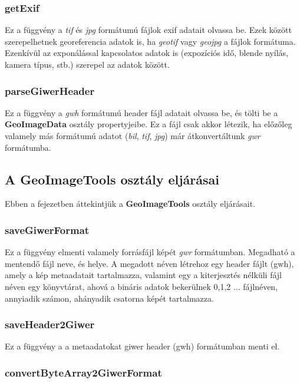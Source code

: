 \documentclass[a4paper,12pt]{article}
\begin{document}
\subsubsection{getExif}

Ez a függvény a \textit{tif} és \textit{jpg} formátumú fájlok exif adatait olvassa be. Ezek között szerepelhetnek georeferencia adatok is, ha \textit{geotif} vagy \textit{geojpg} a fájlok formátuma. Ezenkívül az exponálással kapcsolatos adatok is (expozíciós idő, blende nyílás, kamera típus, stb.) szerepel az adatok között.


\subsubsection{parseGiwerHeader}

Ez a függvény a \textit{gwh} formátumú header fájl adatait olvassa be, és tölti be a \textbf{GeoImageData} osztály propertyjeibe. Ez a fájl csak akkor létezik, ha előzőleg valamely más formátumú adatot (\textit{bil}, \textit{tif}, \textit{jpg}) már átkonvertáltunk \textit{gwr} formátumba.




\subsection{A \textbf{GeoImageTools} osztály eljárásai}

Ebben a fejezetben áttekintjük a \textbf{GeoImageTools} osztály eljárásait.

\subsubsection{saveGiwerFormat}

Ez a függvény elmenti valamely forrásfájl képét \textit{gwr} formátumban. Megadható a mentendő fájl neve, és helye. A megadott néven létrehoz egy header fájlt (gwh), amely a kép metaadatait tartalmazza, valamint egy a kiterjesztés nélküli fájl néven egy könyvtárat, ahová a bináris adatok bekerülnek 0,1,2 ...   fájlnéven, annyiadik számon, ahányadik csatorna képét tartalmazza.

\subsubsection{saveHeader2Giwer}

Ez a függvény a a metaadatokat giwer header (gwh) formátumban menti el.

\subsubsection{convertByteArray2GiwerFormat}
\end{document}
